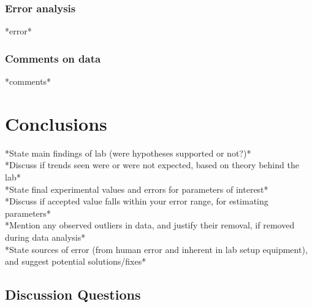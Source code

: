 \documentclass[
	letterpaper, %
	10pt, %
]{CSUniSchoolLabReport}
\newcommand{\dd}[0]{\text{d}}
\begin{document}



\subsubsection{Error analysis}
*error*
\subsubsection{Comments on data}
*comments*

\section{Conclusions}
*State main findings of lab (were hypotheses supported or not?)*\\
*Discuss if trends seen were or were not expected, based on theory behind the lab*\\
*State final experimental values and errors for parameters of interest*\\
*Discuss if accepted value falls within your error range, for estimating parameters*\\
*Mention any observed outliers in data, and justify their removal, if removed during data
analysis*\\
*State sources of error (from human error and inherent in lab setup equipment), and
suggest potential solutions/fixes*

\subsection{Discussion Questions}
\end{document}
